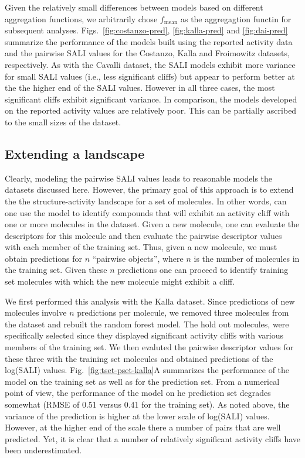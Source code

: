 \documentclass[letterpaper, 12pt]{article}
\begin{document}
Given the relatively small differences between models based on
different aggregation functions, we arbitrarily chose
$f_{\textrm{mean}}$ as the aggregagtion functin for subsequent
analyses. Figs.~\ref{fig:costanzo-pred}, \ref{fig:kalla-pred} and
\ref{fig:dai-pred} summarize the performance of the models built using
the reported activity data and the pairwise SALI values for the
Costanzo, Kalla and Froimowitz datasets, respectively. As with the
Cavalli dataset, the SALI models exhibit more variance for small SALI
values (i.e., less significant cliffs) but appear to perform better at
the the higher end of the SALI values. However in all three cases, the
most significant cliffs exhibit significant variance. In comparison,
the models developed on the reported activity values are relatively
poor. This can be partially ascribed to the small sizes of the
dataset.

\subsection{Extending a landscape}
\label{sec:extending-landscape}

Clearly, modeling the pairwise SALI values leads to reasonable models
the datasets discussed here. However, the primary goal of this
approach is to extend the the structure-activity landscape for a set
of molecules. In other words, can one use the model to identify
compounds that will exhibit an activity cliff with one or more
molecules in the dataset. Given a new molecule, one can evaluate the
descriptors for this molecule and then evaluate the pairwise
descriptor values with each member of the training set. Thus, given a
new molecule, we must obtain predictions for $n$ ``pairwise objects'',
where $n$ is the number of molecules in the training set. Given these
$n$ predictions one can proceed to identify training set molecules
with which the new molecule might exhibit a cliff.

We first performed this analysis with the Kalla dataset. Since
predictions of new molecules involve $n$ predictions per molecule, we
removed three molecules from the dataset and rebuilt the random
forest model. The hold out molecules, were specifically selected since
they displayed significant activity cliffs with various members of the
training set. We then evaluted the pairwise descriptor values for
these three with the training set molecules and obtained predictions
of the log(SALI) values. Fig.~\ref{fig:tset-pset-kalla}A
summarizes the performance of the model on the training set as well as
for the prediction set. From a numerical point of view, the
performance of the model on he prediction set degrades somewhat (RMSE
of 0.51 versus 0.41 for the training set). As noted above, the
variance of the prediction is higher at the lower scale of log(SALI)
values. However, at the higher end of the scale there a number of
pairs that are well predicted. Yet, it is clear that a number of
relatively significant activity cliffs have been underestimated.
\end{document}
